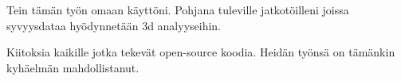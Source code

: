 Tein tämän työn omaan käyttöni. Pohjana tuleville jatkotöilleni joissa syvyysdataa hyödynnetään 3d analyyseihin.

Kiitoksia kaikille jotka tekevät open-source koodia. Heidän työnsä on tämänkin kyhäelmän mahdollistanut.